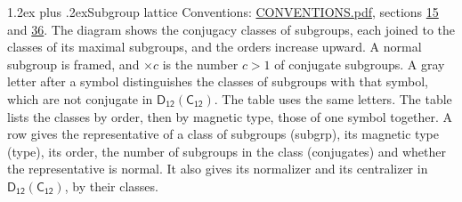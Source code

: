\documentclass[10pt,a4paper]{article}
\makeatletter
\renewcommand\section{\@startsection{section}{1}{\z@}{-3ex plus -1ex minus -.2ex}%
  {1.2ex plus .2ex}{\normalfont\large\sffamily\bfseries\color{parttitle}}}
\numberwithin{equation}{section}
\newcommand{\grp}[1]{\mathsf{#1}}
\makeatother
\begin{document}
\section{Subgroup lattice}\label{s:subgroups}
Conventions: \href{../../CONVENTIONS.pdf}{CONVENTIONS.pdf}, sections \href{../../../rotation/CONVENTIONS.pdf\#conv.15}{15} and \href{../../CONVENTIONS.pdf\#conv.36}{36}.
The diagram shows the conjugacy classes of subgroups, each joined to the classes of its maximal subgroups, and the orders increase upward. \label{n:index.conjugates.c}\label{n:mark.conjugates}A normal subgroup is framed, and ${\times}c$ is the number $c > 1$ of conjugate subgroups. \label{n:mark.letter}A gray letter after a symbol distinguishes the classes of subgroups with that symbol, which are not conjugate in $\grp{D_{12}}(\grp{C_{12}})$. The table uses the same letters. The table lists the classes by order, then by magnetic type, those of one symbol together. \label{n:head.subgroup}\label{n:head.magnetic.type}\label{n:head.order}\label{n:head.conjugates}\label{n:head.normal}A row gives the representative of a class of subgroups (subgrp), its magnetic type (type), its order, the number of subgroups in the class (conjugates) and whether the representative is normal. \label{n:head.normalizer}\label{n:head.centralizer}It also gives its normalizer and its centralizer in $\grp{D_{12}}(\grp{C_{12}})$, by their classes. 
\end{document}
